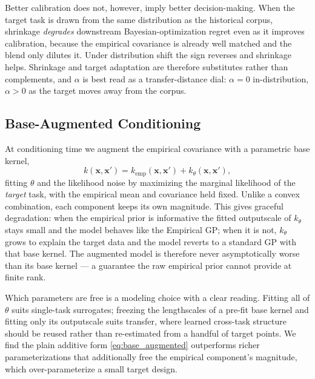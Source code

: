 \documentclass[10pt]{article}
\newcommand{\vx}{\mathbf{x}}
\begin{document}
Better calibration does not, however, imply better decision-making. When the target
task is drawn from the same distribution as the historical corpus, shrinkage
\emph{degrades} downstream Bayesian-optimization regret even as it improves
calibration, because the empirical covariance is already well matched and the blend
only dilutes it. Under distribution shift the sign reverses and shrinkage helps.
Shrinkage and target adaptation are therefore substitutes rather than complements,
and $\alpha$ is best read as a transfer-distance dial: $\alpha = 0$
in-distribution, $\alpha > 0$ as the target moves away from the corpus.

\subsection{Base-Augmented Conditioning}
\label{apd:base_augmented}

At conditioning time we augment the empirical covariance with a parametric base
kernel,
\begin{equation}
\label{eq:base_augmented}
    k(\vx,\vx') = k_{\text{emp}}(\vx,\vx') + k_{\theta}(\vx,\vx'),
\end{equation}
fitting $\theta$ and the likelihood noise by maximizing the marginal likelihood of
the \emph{target} task, with the empirical mean and covariance held fixed. Unlike a
convex combination, each component keeps its own magnitude. This gives graceful
degradation: when the empirical prior is informative the fitted outputscale of
$k_\theta$ stays small and the model behaves like the Empirical GP; when it is not,
$k_\theta$ grows to explain the target data and the model reverts to a standard GP
with that base kernel. The augmented model is therefore never asymptotically worse
than its base kernel --- a guarantee the raw empirical prior cannot provide at
finite rank.

Which parameters are free is a modeling choice with a clear reading. Fitting all of
$\theta$ suits single-task surrogates; freezing the lengthscales of a pre-fit base
kernel and fitting only its outputscale suits transfer, where learned cross-task
structure should be reused rather than re-estimated from a handful of target
points. We find the plain additive form \eqref{eq:base_augmented} outperforms richer
parameterizations that additionally free the empirical component's magnitude, which
over-parameterize a small target design.
\end{document}
